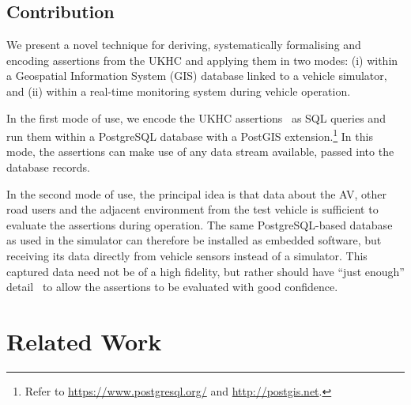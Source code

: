 \subsection{Contribution}
We present a novel technique for deriving, systematically formalising and encoding assertions from the UKHC and applying them in two modes: (i) within a Geospatial Information System (GIS) database linked to a vehicle simulator, and (ii) within a real-time monitoring system during vehicle operation.

In the first mode of use, we encode the UKHC assertions~\cite{highwayCode} as SQL queries and run them within a PostgreSQL database with a PostGIS extension.\footnote{Refer to  \url{https://www.postgresql.org/} and \url{http://postgis.net}.} In this mode, the assertions can make use of any data stream available, passed into the database records.

In the second mode of use, the principal idea is that data about the AV, other road users and the adjacent environment from the test vehicle is sufficient to evaluate the assertions during operation. The same PostgreSQL-based database as used in the simulator can therefore be installed as embedded software, but receiving its data directly from vehicle sensors instead of a simulator. This captured data need not be of a high fidelity, but rather should have ``just enough'' detail~\cite{Koopman2018} to allow the assertions to be evaluated with good confidence.



\section{Related Work}
\label{Related_work}


